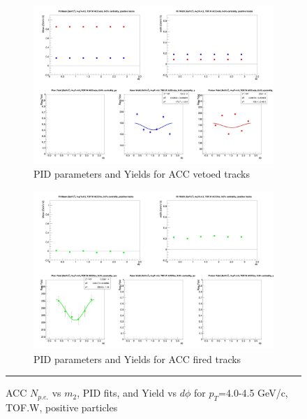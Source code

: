 \begin{figure}[H]
  \ContinuedFloat
    \begin{subfigure}{1\textwidth}
    \includegraphics[width=1\textwidth]{hiptfits/pos/fitParams_tof2_cent0_ch1_pT-40-45.jpg}
    \caption{PID parameters and Yields for ACC vetoed tracks}
    \end{subfigure}    
    \begin{subfigure}{1\textwidth}
    \includegraphics[width=1\textwidth]{hiptfits/pos/fitParams_tof3_cent0_ch1_pT-40-45.jpg}
    \caption{PID parameters and Yields for ACC fired tracks}
    \end{subfigure} 
    \rule{35em}{0.5pt}
  \caption[ACC $N_{p.e.}$ vs $m_2$, PID fits, and Yield vs $d\phi$ for $p_T$=4.0-4.5 GeV/c, TOF.W, positive particles]{ACC $N_{p.e.}$ vs $m_2$, PID fits, and Yield vs $d\phi$ for $p_T$=4.0-4.5 GeV/c, TOF.W, positive particles}
  \label{fig:acc40-45pos}
\end{figure}

\restoregeometry



\begin{table}
\end{table}